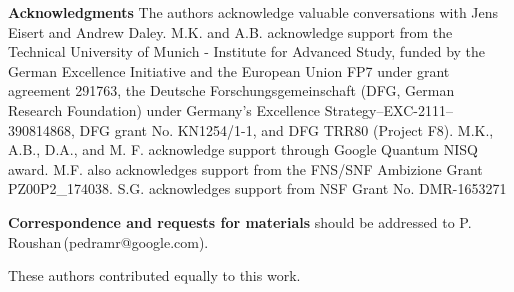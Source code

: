 \noindent \textbf{Acknowledgments} \footnotesize{ The authors acknowledge valuable conversations with Jens Eisert and Andrew Daley. M.K. and A.B. acknowledge support from the Technical University of Munich - Institute for Advanced Study, funded by the German Excellence Initiative and the European Union FP7 under grant agreement 291763, the Deutsche Forschungsgemeinschaft (DFG, German Research Foundation) under Germany's Excellence Strategy--EXC-2111--390814868, DFG grant No. KN1254/1-1, and DFG TRR80 (Project F8). M.K., A.B., D.A., and M. F. acknowledge support through Google Quantum NISQ award.  M.F. also acknowledges support from the FNS/SNF Ambizione Grant PZ00P2\_174038. S.G. acknowledges support from NSF Grant No. DMR-1653271}

\vspace{1em}
\noindent \textbf{Correspondence and requests for materials}
\small{should be addressed to P. Roushan\,(pedramr@google.com).}

\vspace{1em}
\noindent * These authors contributed equally to this work.

%


